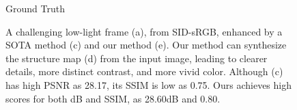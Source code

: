 \documentclass[CJK,aspectratio=169]{beamer}  %
\begin{document}
\begin{frame}
\begin{figure}
\begin{minipage}{.25\textwidth}
				\captionsetup{font=scriptsize}
				\label{fig: Ground Truth}	
				\caption*{Ground Truth}
			\end{minipage}
			\captionsetup{font=scriptsize}
			\caption{
				\label{fig: Structure Information}
				A challenging low-light frame (a), from SID-sRGB\cite{chen2018learning},
				enhanced by a SOTA method (c) and our method (e). Our method
				can synthesize the structure map (d) from the input image, leading
				to clearer details, more distinct contrast, and more vivid color. Although
				(c) has high PSNR as 28.17, its SSIM is low as 0.75. Ours
				achieves high scores for both dB and SSIM, as 28.60dB and 0.80.
			}
		\end{figure}
	\end{frame}
	
\end{document}
